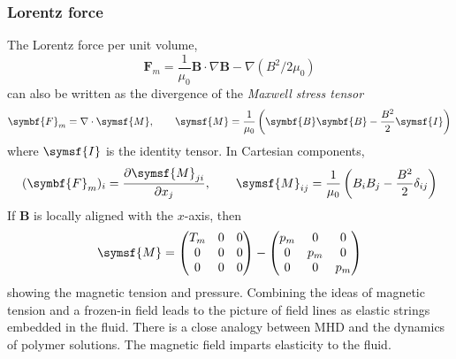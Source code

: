 \documentclass{jknotes}
\newcommand{\B}{\symbf{B}}
\begin{document}
\subsubsection{Lorentz force}
The Lorentz force per unit volume, 
\begin{equation}
	\symbf{F}_m = \frac{1}{\mu_0} \B \cdot \nabla \B - \nabla (B^2/2\mu_0)
\end{equation}
can also be written as the divergence of the \emph{Maxwell stress tensor}
\begin{equation}
	\symbf{F}_m = \nabla \cdot \symsf{M}, \hspace{2em}\symsf{M} =
	\frac{1}{\mu_0} \left( \B \B - \frac{B^2}{2}\symsf{I}\right)
\end{equation}
where $\symsf{I}$ is the identity tensor. In Cartesian components,
\begin{equation}
	(\symbf{F}_m)_i = \frac{\partial \symsf{M}_{ji}}{\partial x_j},
	\hspace{2em} \symsf{M}_{ij} = \frac{1}{\mu_0} \left( B_i B_j -
	\frac{B^2}{2}\delta_{ij} \right)
\end{equation}
If $\B$ is locally aligned with the $x$-axis, then
\begin{equation}
	\symsf{M} = \begin{pmatrix} T_m & 0 & 0 \\ 0 & 0 & 0 \\ 0 & 0 & 0
		\end{pmatrix} - \begin{pmatrix} p_m & 0 &0  \\ 0 & p_m & 0 \\ 0 & 0 &
	p_m \end{pmatrix}
\end{equation}
showing the magnetic tension and pressure. Combining the ideas of magnetic
tension and a frozen-in field leads to the picture of field lines as elastic
strings embedded in the fluid. There is a close analogy between MHD and the
dynamics of polymer solutions. The magnetic field imparts elasticity to the
fluid.
\end{document}
